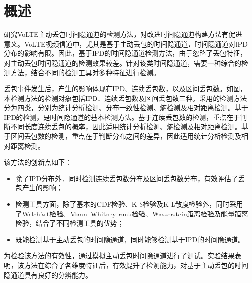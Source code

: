 \section{概述}
\label{chap:analyze:overview}

研究VoLTE主动丢包时间隐通道的检测方法，对改进时间隐通道构建方法有促进意义。VoLTE视频信道中，尤其是基于主动丢包的时间隐通道，时间隐通道对IPD分布的影响有限。因此，基于IPD的时间隐通道检测方法，由于忽略了丢包特征，对主动丢包时间隐通道的检测效果较差。针对该类时间隐通道，需要一种综合的检测方法，结合不同的检测工具对多种特征进行检测。


丢包事件发生后，产生的影响体现在IPD、连续丢包数，以及区间丢包数。如图，本检测方法的检测对象包括IPD、连续丢包数及区间丢包数三种。采用的检测方法分为四类，分别为统计分析检测、分布一致性检测、熵检测及相对距离检测。基于IPD的检测，是时间隐通道的基本检测方法。基于连续丢包数的检测，重点在于判断不同长度连续丢包的概率，因此适用统计分析检测、熵检测及相对距离检测。基于区间丢包数的检测，重点在于判断分布之间的差异，因此适用统计分析检测及相对距离检测。

该方法的创新点如下：
\begin{itemize}
	\item 除了IPD分布外，同时检测连续丢包数分布及区间丢包数分布，有效评估了丢包产生的影响；
	\item 检测工具方面，除了基本的CDF检验、K-S检验及K-L散度检验外，同时采用了Welch's t检验、Mann–Whitney rank检验、Wasserstein距离检验及能量距离检验，结合了不同检测工具的优势；
	\item 既能检测基于主动丢包的时间隐通道，同时能够检测基于IPD的时间隐通道。
\end{itemize}

为检验该方法的有效性，通过模拟主动丢包时间隐通道进行了测试。实验结果表明，该方法在综合了各维度特征后，有效提升了检测能力，对基于主动丢包的时间隐通道具有良好的分辨能力。